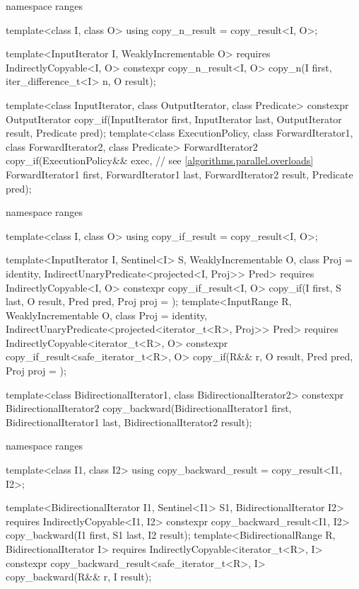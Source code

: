 \begin{codeblock}
{  namespace ranges {
    template<class I, class O>
    using copy_n_result = copy_result<I, O>;

    template<InputIterator I, WeaklyIncrementable O>
      requires IndirectlyCopyable<I, O>
      constexpr copy_n_result<I, O>
        copy_n(I first, iter_difference_t<I> n, O result);
  }

  template<class InputIterator, class OutputIterator, class Predicate>
    constexpr OutputIterator copy_if(InputIterator first, InputIterator last,
                                     OutputIterator result, Predicate pred);
  template<class ExecutionPolicy, class ForwardIterator1, class ForwardIterator2,
           class Predicate>
    ForwardIterator2 copy_if(ExecutionPolicy&& exec, // see \ref{algorithms.parallel.overloads}
                             ForwardIterator1 first, ForwardIterator1 last,
                             ForwardIterator2 result, Predicate pred);

  namespace ranges {
    template<class I, class O>
    using copy_if_result = copy_result<I, O>;

    template<InputIterator I, Sentinel<I> S, WeaklyIncrementable O, class Proj = identity,
             IndirectUnaryPredicate<projected<I, Proj>> Pred>
      requires IndirectlyCopyable<I, O>
      constexpr copy_if_result<I, O>
        copy_if(I first, S last, O result, Pred pred, Proj proj = {});
    template<InputRange R, WeaklyIncrementable O, class Proj = identity,
             IndirectUnaryPredicate<projected<iterator_t<R>, Proj>> Pred>
      requires IndirectlyCopyable<iterator_t<R>, O>
      constexpr copy_if_result<safe_iterator_t<R>, O>
        copy_if(R&& r, O result, Pred pred, Proj proj = {});
  }

  template<class BidirectionalIterator1, class BidirectionalIterator2>
    constexpr BidirectionalIterator2
      copy_backward(BidirectionalIterator1 first, BidirectionalIterator1 last,
                    BidirectionalIterator2 result);

  namespace ranges {
    template<class I1, class I2>
    using copy_backward_result = copy_result<I1, I2>;

    template<BidirectionalIterator I1, Sentinel<I1> S1, BidirectionalIterator I2>
      requires IndirectlyCopyable<I1, I2>
      constexpr copy_backward_result<I1, I2>
        copy_backward(I1 first, S1 last, I2 result);
    template<BidirectionalRange R, BidirectionalIterator I>
      requires IndirectlyCopyable<iterator_t<R>, I>
      constexpr copy_backward_result<safe_iterator_t<R>, I>
        copy_backward(R&& r, I result);
  }

}
\end{codeblock}
